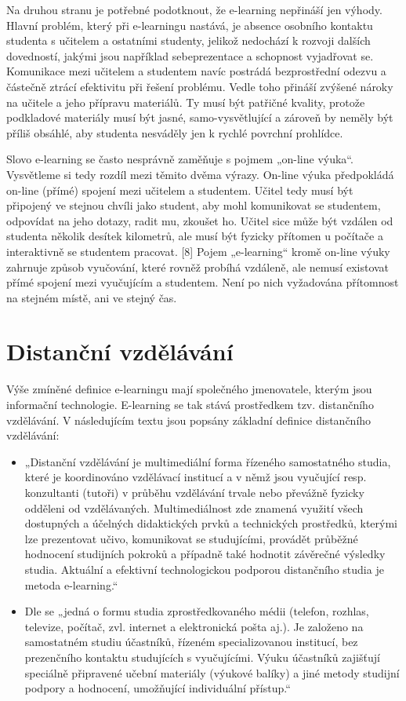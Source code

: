 \documentclass[
print,
  11pt,
  table,   
  nolof,    
  nolot,
  oneside,
  draft
]{fithesis3}
\begin{document}
Na druhou stranu je potřebné podotknout, že e-learning nepřináší jen výhody. Hlavní problém, který při e-learningu nastává, je absence osobního kontaktu studenta s učitelem a ostatními studenty, jelikož nedochází k rozvoji dalších dovedností, jakými jsou například sebeprezentace a schopnost vyjadřovat se. Komunikace mezi učitelem a studentem navíc postrádá bezprostřední odezvu a částečně ztrácí efektivitu při řešení problému. Vedle toho přináší zvýšené nároky na učitele a jeho přípravu materiálů. Ty musí být patřičné kvality, protože podkladové materiály musí být jasné, samo-vysvětlující a zároveň by neměly být příliš obsáhlé, aby studenta nesváděly jen k rychlé povrchní prohlídce.

Slovo e-learning se často nesprávně zaměňuje s pojmem „on-line výuka“. Vysvětleme si tedy rozdíl mezi těmito dvěma výrazy. On-line výuka předpokládá on-line (přímé) spojení mezi učitelem a studentem. Učitel tedy musí být připojený ve stejnou chvíli jako student, aby mohl komunikovat se studentem, odpovídat na jeho dotazy, radit mu, zkoušet ho. Učitel sice může být vzdálen od studenta několik desítek kilometrů, ale musí být fyzicky přítomen u počítače a interaktivně se studentem pracovat. [8] Pojem „e-learning“ kromě on-line výuky zahrnuje způsob vyučování, které rovněž probíhá vzdáleně, ale nemusí existovat přímé spojení mezi vyučujícím a studentem. Není po nich vyžadována přítomnost na stejném místě, ani ve stejný čas.


	\section{Distanční vzdělávání}

Výše zmíněné definice e-learningu mají společného jmenovatele, kterým jsou informační technologie. E-learning se tak stává prostředkem tzv. distančního vzdělávání. V následujícím textu jsou popsány základní definice distančního vzdělávání: 

      \begin{itemize}
	\item „Distanční vzdělávání je multimediální forma řízeného samostatného studia, které je koordinováno vzdělávací institucí a v němž jsou vyučující resp. konzultanti (tutoři) v průběhu vzdělávání trvale nebo převážně fyzicky odděleni od vzdělávaných. Multimediálnost zde znamená využití všech dostupných a účelných didaktických prvků a technických prostředků, kterými lze prezentovat učivo, komunikovat se studujícími, provádět průběžné hodnocení studijních pokroků a případně také hodnotit závěrečné výsledky studia. Aktuální a efektivní technologickou podporou distančního studia je metoda e-learning.“ \cite{zlamalova} 
	\item Dle \cite{prucha} se „jedná o formu studia zprostředkovaného médii (telefon, rozhlas, televize, počítač, zvl. internet a elektronická pošta aj.). Je založeno na samostatném studiu účastníků, řízeném specializovanou institucí, bez prezenčního kontaktu studujících s vyučujícími. Výuku účastníků zajišťují speciálně připravené učební materiály (výukové balíky) a jiné metody studijní podpory a hodnocení, umožňující individuální přístup.“ 
     \end{itemize}
\end{document}
